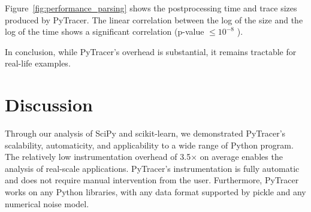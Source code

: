 \documentclass[10pt,journal,compsoc]{IEEEtran}
\newcommand{\pytracer}[0]{PyTracer\xspace}
\DeclareRobustCommand{\remove}[1]{}
\begin{document}

Figure~\ref{fig:performance_parsing} shows the postprocessing time and trace
sizes produced by \pytracer. The linear correlation between the log of the size
and the log of the time shows a significant correlation (p-value $\leq 10^{-8}$
\remove{for RR and p-value $\leq 10^{-3}$ for MCA}).

In conclusion, while \pytracer's overhead is substantial, it remains tractable
for real-life examples.

\section{Discussion}



Through our analysis of SciPy and scikit-learn, we demonstrated \pytracer's
scalability, automaticity, and applicability to a wide range of Python program.
The relatively low instrumentation overhead of 3.5$\times$ on average enables
the analysis of real-scale applications. \pytracer's instrumentation is fully
automatic and does not require manual intervention from the user. Furthermore,
\pytracer works on any Python libraries, with any data format supported by
pickle and any numerical noise model.
\end{document}
